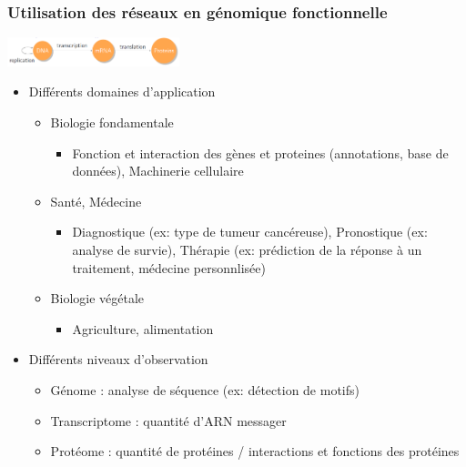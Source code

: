 \begin{frame}
\frametitle{Utilisation des réseaux en génomique fonctionnelle}
\vspace{-0.1cm}
\hspace{6.3cm}	\includegraphics[width=5cm]{Figures/Intro/DogmeBM.png} 
\vspace{-0.5cm}		
\begin{itemize}
\item Différents domaines d'application
\begin{itemize}
\item \textcolor{Periwinkle}{Biologie fondamentale}
\begin{itemize}
\item Fonction et interaction des gènes et proteines (annotations, base de données), Machinerie cellulaire
\end{itemize}
\item \textcolor{Periwinkle}{Santé, Médecine}
\begin{itemize}
\item Diagnostique (ex: type de tumeur cancéreuse), Pronostique (ex: analyse de survie), Thérapie (ex: prédiction de la réponse à un traitement, médecine personnlisée)
\end{itemize}
\item \textcolor{Periwinkle}{Biologie végétale} 
\begin{itemize}
\item Agriculture, alimentation
\end{itemize}
\end{itemize}

\item Différents niveaux d'observation
\begin{itemize}\small
\item \textcolor{Periwinkle}{Génome} : analyse de séquence (ex: détection de motifs)
\item \textcolor{Periwinkle}{Transcriptome} : quantité d'ARN messager
\item \textcolor{Periwinkle}{Protéome} : quantité de protéines / interactions et fonctions des protéines
\end{itemize}
	
\end{itemize}
\end{frame}


